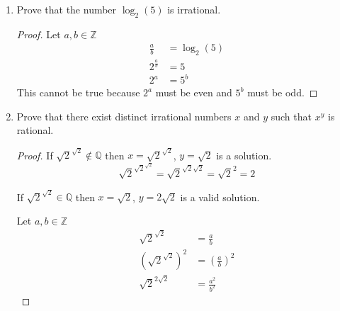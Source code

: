 \documentclass[12pt,a4paper,reqno,parskip=full]{amsart}
\numberwithin{equation}{section}
\theoremstyle{plain}
\theoremstyle{definition}
\begin{document}
\begin{enumerate}
  \item Prove that the number $\log_2(5)$ is irrational.
        \begin{proof}
          Let $a,b\in\mathbb{Z}$
          \begin{align*}
            \frac{a}{b}     & =\log_2(5) \\
            2^{\frac{a}{b}} & = 5        \\
            2^a             & = 5^b
          \end{align*}
          This cannot be true because $2^a$ must be even and $5^b$ must be odd.
        \end{proof}

  \item Prove that there exist distinct irrational numbers $x$ and $y$ such that $x^y$ is rational.
        \begin{proof}
          If $\sqrt{2}^{\sqrt{2}}\notin\mathbb{Q}$ then $x = \sqrt{2}^{\sqrt{2}}$, $y = \sqrt{2}$ is a solution.
          \[\sqrt{2}^{\sqrt{2}^{\sqrt{2}}} = \sqrt{2}^{\sqrt{2}\sqrt{2}} = \sqrt{2}^2 = 2\]

          If $\sqrt{2}^{\sqrt{2}}\in\mathbb{Q}$ then $x = \sqrt{2}$, $y = 2\sqrt{2}$ is a valid solution.

          Let $a,b\in\mathbb{Z}$
          \begin{align*}
            \sqrt{2}^{\sqrt{2}}                & = \frac{a}{b}                \\
            \left(\sqrt{2}^{\sqrt{2}}\right)^2 & = \left(\frac{a}{b}\right)^2 \\
            \sqrt{2}^{2\sqrt{2}}               & = \frac{a^2}{b^2}
          \end{align*}
        \end{proof}
\end{enumerate}
\end{document}
